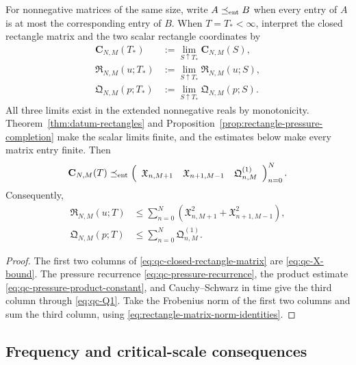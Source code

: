\begin{proposition}
\label{prop:qc-closed-rectangle-matrix}
For nonnegative matrices of the same size, write
\(A\preceq_{\rm ent}B\) when every entry of \(A\) is at most the
corresponding entry of \(B\).  When \(T=T_*<\infty\), interpret the closed
rectangle matrix and the two scalar rectangle coordinates by
\begin{align*}
 \mathbf C_{N,M}(T_*)&:=
 \lim_{S\uparrow T_*}\mathbf C_{N,M}(S),\\
 \mathfrak R_{N,M}(u;T_*)&:=
 \lim_{S\uparrow T_*}\mathfrak R_{N,M}(u;S),\\
 \mathfrak Q_{N,M}(p;T_*)&:=
 \lim_{S\uparrow T_*}\mathfrak Q_{N,M}(p;S).
\end{align*}
All three limits exist in the extended nonnegative reals by monotonicity.
Theorem~\ref{thm:datum-rectangles} and
Proposition~\ref{prop:rectangle-pressure-completion} make the scalar limits
finite, and the estimates below make every matrix entry finite.
Then
\begin{equation}
 \mathbf C_{N,M}(T)
 \preceq_{\rm ent}
 \left(
 \begin{array}{ccc}
  \mathfrak X_{n,M+1}
  &\mathfrak X_{n+1,M-1}
  &\mathfrak Q^{(1)}_{n,M}
 \end{array}
 \right)_{n=0}^{N}.
 \label{eq:qc-closed-rectangle-matrix}
\end{equation}
Consequently,
\begin{align}
 \mathfrak R_{N,M}(u;T)
 &\le\sum_{n=0}^{N}
 \left(\mathfrak X_{n,M+1}^2
       +\mathfrak X_{n+1,M-1}^2\right),
 \label{eq:qc-closed-rectangle-frobenius}\\
 \mathfrak Q_{N,M}(p;T)
 &\le\sum_{n=0}^{N}\mathfrak Q^{(1)}_{n,M}.
 \label{eq:qc-closed-pressure-column}
\end{align}
\end{proposition}

\begin{proof}
The first two columns of \eqref{eq:qc-closed-rectangle-matrix} are
\eqref{eq:qc-X-bound}.  The pressure recurrence
\eqref{eq:qc-pressure-recurrence}, the product estimate
\eqref{eq:qc-pressure-product-constant}, and Cauchy--Schwarz in time give
the third column through \eqref{eq:qc-Q1}.  Take the Frobenius norm of the
first two columns and sum the third column, using
\eqref{eq:rectangle-matrix-norm-identities}.
\end{proof}

\subsection{Frequency and critical-scale consequences}

